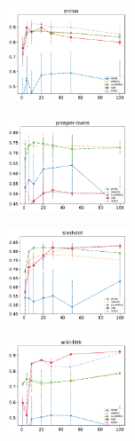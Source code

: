 \begin{subfigure}                                                                        
     \centering                                                                          
         \includegraphics[width=0.32\textwidth]{fig/enron__entropy@_roc_evo}
\end{subfigure}
\begin{subfigure}
         \centering
      \includegraphics[width=0.32\textwidth]{fig/prosper-loans__entropy@_roc_evo}
\end{subfigure}                                                             
\begin{subfigure}                                                           
         \centering                                                         
      \includegraphics[width=0.32\textwidth]{fig/slashdot__entropy@_roc_evo}
\end{subfigure}                                                             
\begin{subfigure}                                                           
         \centering                                                         
      \includegraphics[width=0.32\textwidth]{fig/wiki-link__entropy@_roc_evo}
\end{subfigure}                                                             
